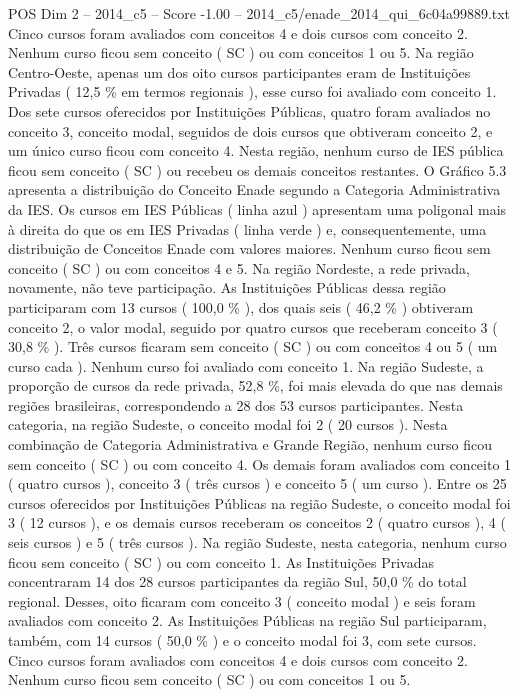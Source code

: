 \begin{textsample}{POS Dim 2 – 2014\_c5 – Score -1.00 – 2014\_c5/enade\_2014\_qui\_6c04a99889.txt}
Cinco cursos foram avaliados com conceitos 4 e dois cursos com conceito 2.
Nenhum curso ficou sem conceito ( SC ) ou com conceitos 1 ou 5.
Na região Centro-Oeste, apenas um dos oito cursos participantes eram de Instituições Privadas ( 12,5 \% em termos regionais ), esse curso foi avaliado com conceito 1.
Dos sete cursos oferecidos por Instituições Públicas, quatro foram avaliados no conceito 3, conceito modal, seguidos de dois cursos que obtiveram conceito 2, e um único curso ficou com conceito 4.
Nesta região, nenhum curso de IES pública ficou sem conceito ( SC ) ou recebeu os demais conceitos restantes.
O Gráfico 5.3 apresenta a distribuição do Conceito Enade segundo a Categoria Administrativa da IES.
Os cursos em IES Públicas ( linha azul ) apresentam uma poligonal mais à direita do que os em IES Privadas ( linha verde ) e, consequentemente, uma distribuição de Conceitos Enade com valores maiores.
Nenhum curso ficou sem conceito ( SC ) ou com conceitos 4 e 5.
Na região Nordeste, a rede privada, novamente, não teve participação.
As Instituições Públicas dessa região participaram com 13 cursos ( 100,0 \% ), dos quais seis ( 46,2 \% ) obtiveram conceito 2, o valor modal, seguido por quatro cursos que receberam conceito 3 ( 30,8 \% ).
Três cursos ficaram sem conceito ( SC ) ou com conceitos 4 ou 5 ( um curso cada ).
Nenhum curso foi avaliado com conceito 1.
Na região Sudeste, a proporção de cursos da rede privada, 52,8 \%, foi mais elevada do que nas demais regiões brasileiras, correspondendo a 28 dos 53 cursos participantes.
Nesta categoria, na região Sudeste, o conceito modal foi 2 ( 20 cursos ).
Nesta combinação de Categoria Administrativa e Grande Região, nenhum curso ficou sem conceito ( SC ) ou com conceito 4.
Os demais foram avaliados com conceito 1 ( quatro cursos ), conceito 3 ( três cursos ) e conceito 5 ( um curso ).
Entre os 25 cursos oferecidos por Instituições Públicas na região Sudeste, o conceito modal foi 3 ( 12 cursos ), e os demais cursos receberam os conceitos 2 ( quatro cursos ), 4 ( seis cursos ) e 5 ( três cursos ).
Na região Sudeste, nesta categoria, nenhum curso ficou sem conceito ( SC ) ou com conceito 1.
As Instituições Privadas concentraram 14 dos 28 cursos participantes da região Sul, 50,0 \% do total regional.
Desses, oito ficaram com conceito 3 ( conceito modal ) e seis foram avaliados com conceito 2.
As Instituições Públicas na região Sul participaram, também, com 14 cursos ( 50,0 \% ) e o conceito modal foi 3, com sete cursos.
Cinco cursos foram avaliados com conceitos 4 e dois cursos com conceito 2.
Nenhum curso ficou sem conceito ( SC ) ou com conceitos 1 ou 5.

\end{textsample}
